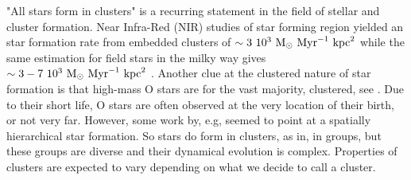 "All stars form in clusters" is a recurring statement in the field of stellar and cluster formation. Near Infra-Red (NIR) studies of star forming region yielded an star formation rate from embedded clusters of $\sim 3~10^3~{\textrm{M}_\odot} ~\textrm{Myr}^{-1}~ \textrm{kpc}^2$ \citep{Lada2003} while the same estimation for field stars in the milky way gives $\sim3-7~10^3~{\textrm{M}_\odot}~\textrm{Myr}^{-1}~\textrm{kpc}^2$ \citep{Miller1979}. Another clue at the clustered nature of star formation is that high-mass O stars are for the vast majority, clustered, see \cite{DeWit2005}. Due to their short life, O stars are often observed at the very location of their birth, or not very far. However, some work by, e.g,  \cite{Gutermuth2011} seemed to point at a spatially hierarchical star formation. So stars do form in clusters, as in, in groups, but these groups are diverse and their dynamical evolution is complex. Properties of clusters are expected to vary depending on what we decide to call a cluster.






%


%


